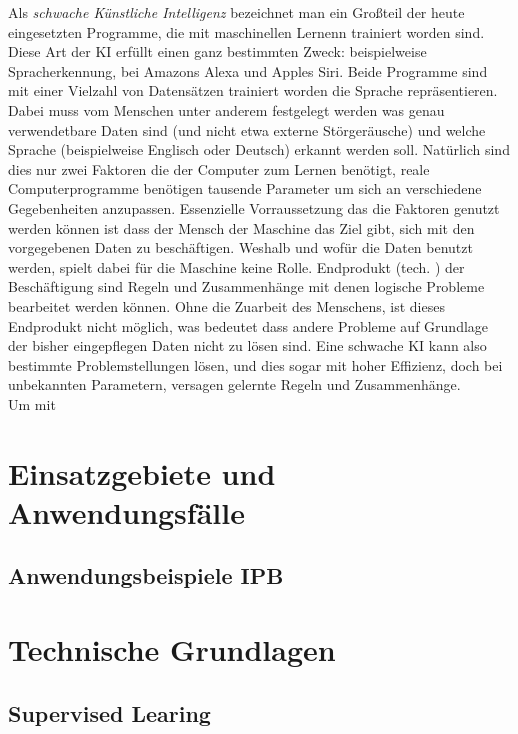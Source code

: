 \documentclass[12pt]{report}
\begin{document}
    Als \emph{schwache Künstliche Intelligenz} bezeichnet man ein Großteil der heute eingesetzten Programme, die mit
    maschinellen Lernenn trainiert worden sind. Diese Art der KI erfüllt einen ganz bestimmten Zweck:
    beispielweise Spracherkennung, bei Amazons Alexa und Apples Siri. Beide Programme sind mit einer Vielzahl von
    Datensätzen trainiert worden die Sprache repräsentieren. Dabei muss vom Menschen unter anderem festgelegt werden
    was genau verwendetbare Daten sind (und nicht etwa externe Störgeräusche) und welche Sprache
    (beispielweise Englisch oder Deutsch) erkannt werden soll. Natürlich sind dies nur zwei Faktoren die der Computer zum
    Lernen benötigt, reale Computerprogramme benötigen tausende Parameter um sich an verschiedene Gegebenheiten anzupassen.
    Essenzielle Vorraussetzung das die Faktoren genutzt werden können ist dass der Mensch der Maschine
    das Ziel gibt, sich mit den vorgegebenen Daten zu beschäftigen. Weshalb und wofür die Daten benutzt werden, spielt
    dabei für die Maschine keine Rolle. Endprodukt (tech. ) der Beschäftigung sind Regeln und Zusammenhänge
    mit denen logische Probleme bearbeitet werden können. Ohne die Zuarbeit des Menschens, ist dieses Endprodukt nicht
    möglich, was bedeutet dass andere Probleme auf Grundlage der bisher eingepflegen Daten nicht zu lösen sind.
    Eine schwache KI kann also bestimmte Problemstellungen lösen, und dies sogar mit hoher Effizienz, doch bei
    unbekannten Parametern, versagen gelernte Regeln und Zusammenhänge.\\

    Um mit






    \section{Einsatzgebiete und Anwendungsfälle}

    \subsection{Anwendungsbeispiele IPB}
    \section{Technische Grundlagen}
    \subsection{Supervised Learing}
\end{document}

